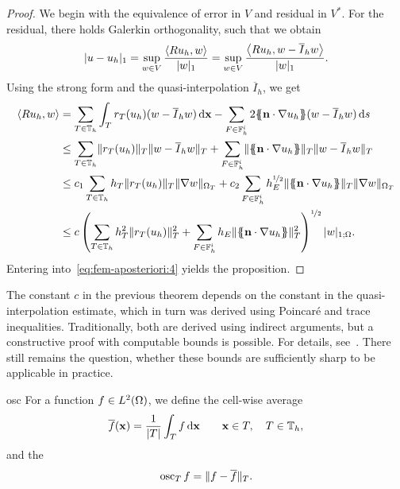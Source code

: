 \begin{proof}
  We begin with the equivalence of error in $V$ and residual in
  $V^*$. For the residual, there holds Galerkin orthogonality, such
  that we obtain
  \begin{gather}
    \label{eq:fem-aposteriori:4}
    \lvert u-u_h\rvert_1
    = \sup_{w\in V}\frac{\left<Ru_h,w\right>}{\lvert w\rvert_1}
    = \sup_{w\in V}\frac{\left<Ru_h,w- \overline I_h w\right>}{\lvert w\rvert_1}.
  \end{gather}
  Using the strong form and the quasi-interpolation $\overline I_h$,
  we get
  \begin{align*}
    \left<Ru_h,w\right>
    &= \sum_{\cell\in\mesh_h}\int_{\cell} r_\cell(u_h) (w-\overline I_h w)\dvx
    - \sum_{F\in \mathbb F_h^i} 2\mvl{\n\cdot\nabla u_h} (w-\overline I_h w)\ds
    \\
    & \le \sum_{\cell\in\mesh_h} \norm{r_\cell(u_h)}_\cell
      \norm{w-\overline I_h w}_\cell
      + \sum_{F\in \mathbb F_h^i} \norm{\mvl{\n\cdot\nabla u_h}}_\cell
      \norm{w-\overline I_h w}_\cell
      \\
    & \le c_1 \sum_{\cell\in\mesh_h} h_\cell
      \norm{r_\cell(u_h)}_\cell
      \norm{\nabla w}_{\domain_\cell}
      + c_2 \sum_{F\in \mathbb F_h^i} h_E^{\nicefrac12}
      \norm{\mvl{\n\cdot\nabla u_h}}_\cell
      \norm{\nabla w}_{\domain_\cell}
      \\
    & \le c \left(\sum_{\cell\in\mesh_h} h_\cell^2
      \norm{r_\cell(u_h)}_\cell^2 +
      \sum_{F\in \mathbb F_h^i} h_E
      \norm{\mvl{\n\cdot\nabla u_h}}_\cell^2\right)^{\nicefrac12}
      \snorm{w}_{1;\domain}.
  \end{align*}
  Entering into~\eqref{eq:fem-aposteriori:4} yields the proposition.
\end{proof}

\begin{remark}
  The constant $c$ in the previous theorem depends on the constant in
  the quasi-interpolation estimate, which in turn was derived using
  Poincaré and trace inequalities. Traditionally, both are derived
  using indirect arguments, but a constructive proof with computable
  bounds is possible. For details, see~\cite[Chapter
  3]{Verfuerth13}. There still remains the question, whether these
  bounds are sufficiently sharp to be applicable in practice.
\end{remark}

\begin{Definition}{osc}
  For a function $f\in L^2(\Omega)$, we define the cell-wise average
  \begin{gather}
    \overline f(\mathbf x) = \frac1{\lvert T\rvert}\int_T f \,\mathrm{d} \mathbf x
    \qquad\mathbf x\in T, \quad T\in\mathbb T_h,
  \end{gather}
  and the 
  \begin{gather}
    \operatorname{osc}_T f = \lVert f-\overline f\rVert_T.
  \end{gather}
\end{Definition}

